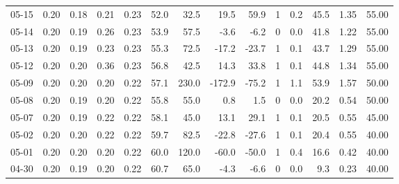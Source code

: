 \begin{threeparttable}
{\begin{tabular}{lrrrrrrrrrrrrr}
  05-15 &          0.20 &          0.18 &          0.21 &        0.23 &                52.0 &                32.5 &       19.5 &         59.9 &              1 &                 0.2 &             45.5 &            1.35 &                  55.00 \\
  05-14 &          0.20 &          0.19 &          0.26 &        0.23 &                53.9 &                57.5 &       -3.6 &         -6.2 &              0 &                 0.0 &             41.8 &            1.22 &                  55.00 \\
  05-13 &          0.20 &          0.19 &          0.23 &        0.23 &                55.3 &                72.5 &      -17.2 &        -23.7 &              1 &                 0.1 &             43.7 &            1.29 &                  55.00 \\
  05-12 &          0.20 &          0.20 &          0.36 &        0.23 &                56.8 &                42.5 &       14.3 &         33.8 &              1 &                 0.1 &             44.8 &            1.34 &                  55.00 \\
  05-09 &          0.20 &          0.20 &          0.20 &        0.22 &                57.1 &               230.0 &     -172.9 &        -75.2 &              1 &                 1.1 &             53.9 &            1.57 &                  50.00 \\
  05-08 &          0.20 &          0.19 &          0.20 &        0.22 &                55.8 &                55.0 &        0.8 &          1.5 &              0 &                 0.0 &             20.2 &            0.54 &                  50.00 \\
  05-07 &          0.20 &          0.19 &          0.22 &        0.22 &                58.1 &                45.0 &       13.1 &         29.1 &              1 &                 0.1 &             20.5 &            0.55 &                  45.00 \\
  05-02 &          0.20 &          0.20 &          0.22 &        0.22 &                59.7 &                82.5 &      -22.8 &        -27.6 &              1 &                 0.1 &             20.4 &            0.55 &                  40.00 \\
  05-01 &          0.20 &          0.20 &          0.20 &        0.22 &                60.0 &               120.0 &      -60.0 &        -50.0 &              1 &                 0.4 &             16.6 &            0.42 &                  40.00 \\
  04-30 &          0.20 &          0.19 &          0.20 &        0.22 &                60.7 &                65.0 &       -4.3 &         -6.6 &              0 &                 0.0 &              9.3 &            0.23 &                  40.00 \\

\end{tabular}}
\end{threeparttable}
